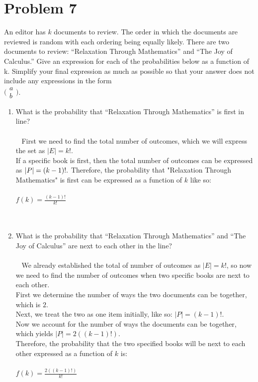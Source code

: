 \documentclass{amsart}
\theoremstyle{definition}
\theoremstyle{Exercise}
\theoremstyle{remark}
\theoremstyle{rule}
\numberwithin{equation}{section}
\begin{document}
 \newpage

\section*{Problem 7}
An editor has $k$ documents to review.  The order in which the documents are reviewed is random with each ordering being equally likely. There are two documents to review: ``Relaxation Through Mathematics'' and ``The Joy of Calculus.'' Give an expression for each of the probabilities below as a function of k. Simplify your final expression as much as possible so that your answer does not include any expressions in the form\\
$
\Big(
 \begin{array}{c}
 a\\
 b
    \end{array}
    \Big)
$.
 \begin{enumerate}[label=(\alph*)]
\item What is the probability that ``Relaxation Through Mathematics'' is first in line?\\\\\
First we need to find the total number of outcomes, which we will express the set as $|E| = k!$.\\
If a specific book is first, then the total number of outcomes can be expressed as $|P| = (k-1)!.\\$
Therefore, the probability that "Relaxation Through Mathematics" is first can be expressed as a function of $k$ like so:\\\\
$f(k) = \frac{(k-1)!}{k!}$
\\\\\
\item What is the probability that ``Relaxation Through Mathematics'' and ``The Joy of Calculus'' are next to each other in the line?\\\\\
We already established the total of number of outcomes as $|E| = k!$, so now we need to find the number of outcomes when two specific books are next to each other.\\
First we determine the number of ways the two documents can be together, which is $2$.\\
Next, we treat the two as one item initially, like so: $|P| = (k-1)!$.\\
Now we account for the number of ways the documents can be together, which yields $|P| = 2((k-1)!)$.\\
Therefore, the probability that the two specified books will be next to each other expressed as a function of $k$ is:\\\\
$f(k) = \frac{2((k-1)!)}{k!}$
\\\\\
\end{enumerate}
\end{document}
